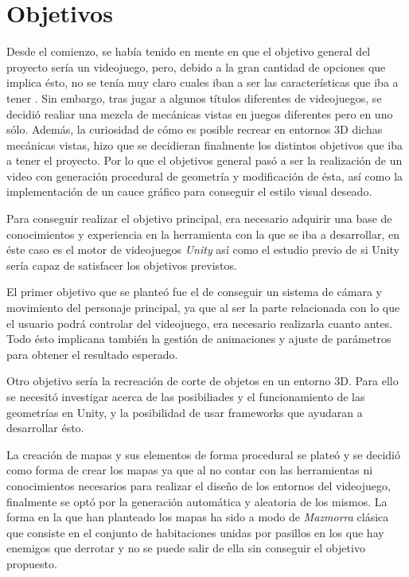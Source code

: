 \chapter{Objetivos}
\label{chap:objetivos}

Desde el comienzo, se había tenido en mente en que el objetivo general del proyecto sería un videojuego, pero, debido a la gran cantidad de opciones que implica ésto, no se tenía muy claro cuales iban a ser las características que iba a tener . Sin embargo, tras jugar a algunos títulos diferentes de videojuegos, se decidió realiar una mezcla de  mecánicas vistas en juegos diferentes pero en uno sólo. Además, la curiosidad de cómo es posible recrear en entornos 3D dichas mecánicas vistas, hizo que se decidieran finalmente los distintos objetivos que iba a tener el proyecto. Por lo que el objetivos general pasó a ser la realización de un video con generación procedural de geometría y modificación de ésta, así como la implementación de un cauce gráfico para conseguir el estilo visual deseado.

Para conseguir realizar el objetivo principal, era necesario adquirir una base de conocimientos y experiencia en la herramienta con la que se iba a desarrollar, en éste caso es el motor de videojuegos \textit{Unity} así como el estudio previo de si Unity sería capaz de satisfacer los objetivos previstos.

El primer objetivo que se planteó fue el de conseguir un sistema de cámara y movimiento del personaje principal, ya que al ser la parte relacionada con lo que el usuario podrá controlar del videojuego, era necesario realizarla cuanto antes. Todo ésto implicana también la gestión de animaciones y ajuste de parámetros para obtener el resultado esperado.

Otro objetivo sería la recreación de corte de objetos en un entorno 3D. Para ello se necesitó investigar acerca de las posibiliades y el funcionamiento de las geometrías en Unity, y la posibilidad de usar frameworks que ayudaran a desarrollar ésto.

La creación de mapas y sus elementos de forma procedural se plateó y se decidió como forma de crear los mapas ya que al no contar con las herramientas ni conocimientos necesarios para realizar el diseño de los entornos del videojuego, finalmente se optó por la generación automática y aleatoria de los mismos. La forma en la que han planteado los mapas ha sido a modo de \textit{Mazmorra} clásica que consiste en el conjunto de habitaciones unidas por pasillos en los que hay enemigos que derrotar y no se puede salir de ella sin conseguir el objetivo propuesto.

